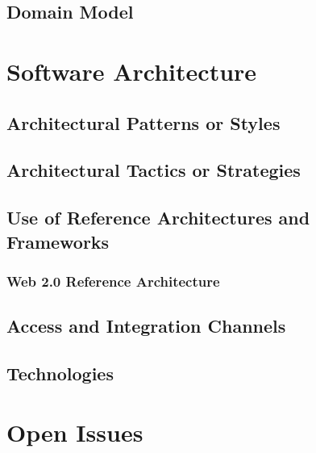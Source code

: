 \documentclass[a4paper,12pt]{article}
\begin{document}
\subsection{Domain Model}

\newpage
\section{Software Architecture}

\subsection{Architectural Patterns or Styles}

\subsection{Architectural Tactics or Strategies}

\subsection{Use of Reference Architectures and Frameworks}

\subsubsection{Web 2.0 Reference Architecture}

\subsection{Access and Integration Channels}

\subsection{Technologies}

\newpage
\section{Open Issues}
\end{document}
